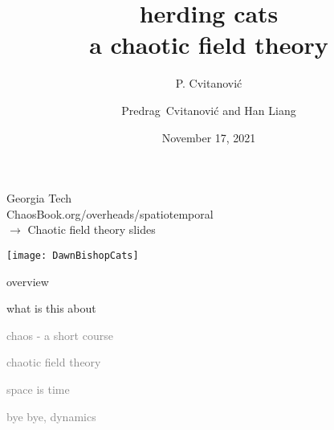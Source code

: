 \title{
{\huge herding cats} %
    \\
{a chaotic field theory}
}
\author{P. Cvitanovi\'c}
\author[Cvitanovi\'c]
{
  \textcolor{green!50!black}{
  {Predrag~Cvitanovi\'c
   and
   Han Liang
  }	%
  }
}
\institute
{
               Georgia Tech
 \\
    {\scriptsize
{}
 {ChaosBook.org/overheads/spatiotemporal}
 \\ $\to$ Chaotic field theory slides
    }
 }
\date{November 17, 2021}

\begin{frame}{} %
\begin{center}
\hfill\texttt{[image: DawnBishopCats]}
\end{center}
\end{frame} %

\begin{frame}
  \titlepage
\end{frame} %


%
\begin{frame}{overview}
\begin{enumerate}
              \item {\Large
what is this about
                  }\textcolor{gray}{\small
              \item
chaos - a short course
              \item
\templatt
              \item
\catlatt
              \item
chaotic field theory
              \item
space is time
              \item
bye bye, dynamics
                    }
            \end{enumerate}
\end{frame} %

